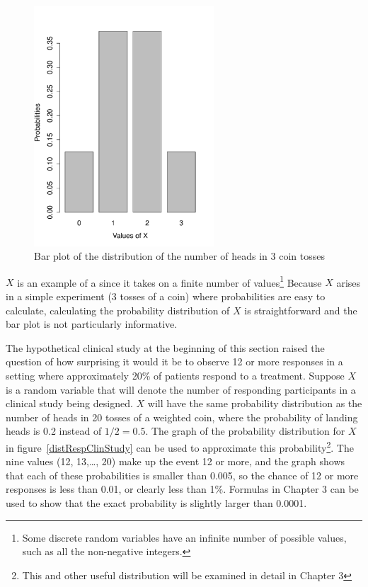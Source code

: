 \begin{doublespace}
\begin{figure}[h]
\centering
\includegraphics[width=0.60\textwidth]
{ch_probability_oi_biostat/figures/barPlotCoinTossing/barPlotCoinTossing.pdf}
\caption{Bar plot of the distribution of the number of heads in 3 coin tosses }
\label{barPlotCoinTossing}
\end{figure}

$X$ is an example of a  since it takes on a finite number of values\footnote{Some discrete random variables have an infinite number of possible values, such as all the non-negative integers.}  Because $X$ arises in a simple experiment (3 tosses of a coin) where probabilities are easy to calculate, calculating the probability distribution of $X$ is straightforward and the bar plot is not particularly informative.  

The hypothetical clinical study at the beginning of this section raised the question of how surprising it would it be to observe 12 or more responses in a setting where approximately 20\% of patients respond to a treatment.  Suppose $X$ is a random variable that will denote the number of responding participants in a clinical study being designed.  $X$ will have the same probability distribution as the number of heads in 20 tosses of a weighted coin, where the probability of landing heads is 0.2 instead of $1/2 = 0.5$.  The graph of the probability distribution for $X$ in figure~\ref{distRespClinStudy} can be used to approximate this probability\footnote{This and other useful distribution will be examined in detail  in Chapter 3}. The nine values (12, 13,\ldots, 20) make up the event 12 or more, and the graph shows that each of these probabilities is smaller than 0.005, so the chance of 12 or more responses is less than 0.01, or clearly less than 1\%.  Formulas in Chapter 3 can be used to show that the exact probability is slightly larger than 0.0001.


\end{doublespace}
